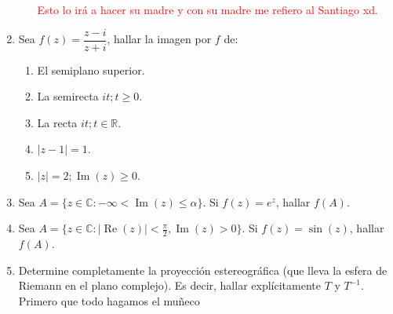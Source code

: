 \documentclass[11pt]{article}
\begin{document}
\begin{enumerate}
\begin{enumerate}
        \textcolor{red}{Esto lo irá a hacer su madre y con su madre me refiero al Santiago xd.}

    \end{enumerate}

    \item  Sea \( f(z) = \dfrac{z - i}{z + i} \), hallar la imagen por \( f \) de:
    \begin{enumerate}
        \item El semiplano superior.
        \item La semirecta \( it; t \geq 0 \).
        \item La recta \( it; t \in \mathbb{R} \).
        \item \( |z - 1| = 1 \).
        \item \( |z| = 2; \operatorname{Im}(z) \geq 0 \).
    \end{enumerate}

    \item Sea \( A = \{ z \in \mathbb{C} : -\infty < \operatorname{Im}(z) \leq \alpha \} \). Si \( f(z) = e^z \), hallar \( f(A) \).

    \item Sea \( A = \{ z \in \mathbb{C} : |\operatorname{Re}(z)| < \frac{\pi}{2}, \operatorname{Im}(z) > 0 \} \). Si \( f(z) = \sin(z) \), hallar \( f(A) \).

    \item Determine completamente la proyección estereográfica (que lleva la esfera de Riemann en el plano complejo). Es decir, hallar explícitamente \( T \) y \( T^{-1} \).\\

Primero que todo hagamos el muñeco

\begin{center} 

\begin{tikzpicture}[x=0.75pt,y=0.75pt,yscale=-1.6,xscale=1.6]


\end{tikzpicture}
\end{center}
\end{enumerate}
\end{document}
